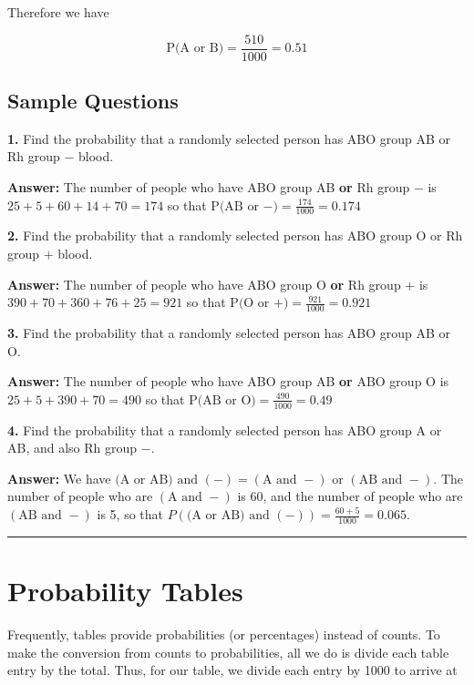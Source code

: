 \documentclass[
]{book}
\begin{document}
Therefore we have

\[
\mbox{P(A or B)} = \frac{510}{1000} = 0.51
\]

\hypertarget{sample-questions-3}{%
\subsection{Sample Questions}\label{sample-questions-3}}

\textbf{1.} Find the probability that a randomly selected person has ABO group AB
or Rh group \(-\) blood.

\textbf{Answer:} The number of people who have ABO group AB \textbf{or} Rh group \(-\) is
\(25 + 5 + 60 + 14 + 70 = 174\) so that
\(\text{P(AB or }-) = \frac{174}{1000} = 0.174\)

\textbf{2.} Find the probability that a randomly selected person has ABO group O
or Rh group \(+\) blood.

\textbf{Answer:} The number of people who have ABO group O \textbf{or} Rh group \(+\) is
\(390 + 70 + 360 + 76 + 25 = 921\) so that
\(\text{P(O or }+) = \frac{921}{1000} = 0.921\)

\textbf{3.} Find the probability that a randomly selected person has ABO group AB or O.

\textbf{Answer:} The number of people who have ABO group AB \textbf{or} ABO group O is
\(25 + 5 + 390 + 70 = 490\) so that
\(\text{P(AB or O)} = \frac{490}{1000} = 0.49\)

\textbf{4.} Find the probability that a randomly selected person has ABO group A or AB,
and also Rh group \(-\).

\textbf{Answer:}
We have \(\text{(A or AB) and }(-) = (\text{A and }-) \text{ or } (\text{AB and }-)\).
The number of people who are \((\text{A and }-)\) is 60, and the number of
people who are \((\text{AB and }-)\) is 5, so that
\(P(\text{(A or AB) and }(-)) = \frac{60+5}{1000} = 0.065\).

\begin{center}\rule{0.5\linewidth}{0.5pt}\end{center}

\hypertarget{probability-tables}{%
\section{Probability Tables}\label{probability-tables}}

Frequently, tables provide probabilities (or percentages) instead of counts.
To make the conversion from counts to probabilities, all we do is divide each table entry by the total.
Thus, for our table, we divide each entry by 1000 to arrive at
\end{document}
